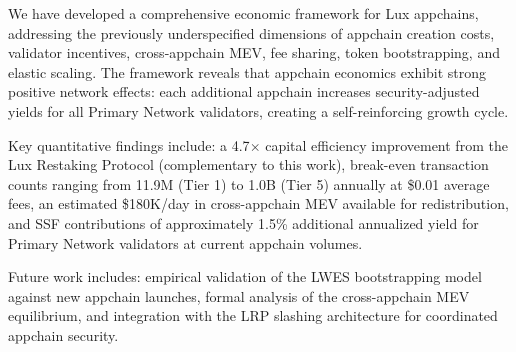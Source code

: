 \documentclass[11pt]{article}
\begin{document}
We have developed a comprehensive economic framework for Lux appchains, addressing the
previously underspecified dimensions of appchain creation costs, validator incentives,
cross-appchain MEV, fee sharing, token bootstrapping, and elastic scaling. The framework
reveals that appchain economics exhibit strong positive network effects: each additional
appchain increases security-adjusted yields for all Primary Network validators, creating
a self-reinforcing growth cycle.

Key quantitative findings include: a 4.7$\times$ capital efficiency improvement from the
Lux Restaking Protocol (complementary to this work), break-even transaction counts ranging
from 11.9M (Tier 1) to 1.0B (Tier 5) annually at \$0.01 average fees, an estimated
\$180K/day in cross-appchain MEV available for redistribution, and SSF contributions of
approximately 1.5\% additional annualized yield for Primary Network validators at current
appchain volumes.

Future work includes: empirical validation of the LWES bootstrapping model against new
appchain launches, formal analysis of the cross-appchain MEV equilibrium, and integration
with the LRP slashing architecture for coordinated appchain security.
\end{document}
